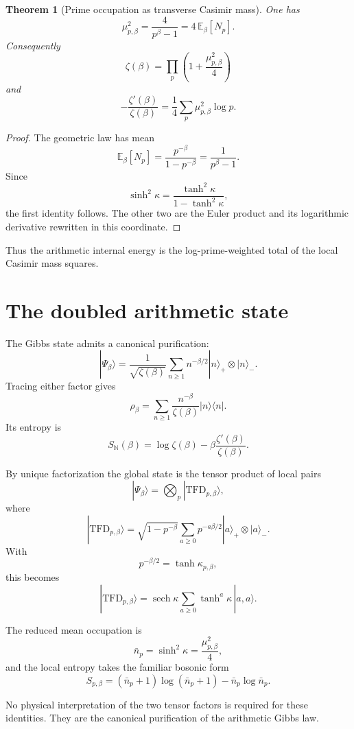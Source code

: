 \documentclass[11pt]{article}
\newtheorem{theorem}{Theorem}[section]
\theoremstyle{definition}
\theoremstyle{remark}
\begin{document}
\begin{theorem}[Prime occupation as transverse Casimir mass]
One has
\[
\boxed{
\mu_{p,\beta}^2
=
\frac{4}{p^\beta-1}
=
4\,\mathbb E_\beta[N_p].
}
\]
Consequently
\[
\boxed{
\zeta(\beta)
=
\prod_p
\left(1+\frac{\mu_{p,\beta}^2}{4}\right)
}
\]
and
\[
\boxed{
-\frac{\zeta'(\beta)}{\zeta(\beta)}
=
\frac14\sum_p
\mu_{p,\beta}^2\log p.
}
\]
\end{theorem}

\begin{proof}
The geometric law has mean
\[
\mathbb E_\beta[N_p]
=
\frac{p^{-\beta}}{1-p^{-\beta}}
=
\frac1{p^\beta-1}.
\]
Since
\[
\sinh^2\kappa
=
\frac{\tanh^2\kappa}{1-\tanh^2\kappa},
\]
the first identity follows.  The other two are the Euler product and its logarithmic derivative rewritten in this coordinate.
\end{proof}

Thus the arithmetic internal energy is the log-prime-weighted total of the local Casimir mass squares.

\section{The doubled arithmetic state}

The Gibbs state admits a canonical purification:
\[
\boxed{
|\Psi_\beta\rangle
=
\frac1{\sqrt{\zeta(\beta)}}
\sum_{n\ge1}
n^{-\beta/2}
|n\rangle_+\otimes|n\rangle_-.
}
\]
Tracing either factor gives
\[
\rho_\beta
=
\sum_{n\ge1}
\frac{n^{-\beta}}{\zeta(\beta)}
|n\rangle\langle n|.
\]
Its entropy is
\[
\boxed{
S_{\mathbb N}(\beta)
=
\log\zeta(\beta)
-\beta\frac{\zeta'(\beta)}{\zeta(\beta)}.
}
\]

By unique factorization the global state is the tensor product of local pairs
\[
|\Psi_\beta\rangle
=
\bigotimes_p
|\mathrm{TFD}_{p,\beta}\rangle,
\]
where
\[
|\mathrm{TFD}_{p,\beta}\rangle
=
\sqrt{1-p^{-\beta}}
\sum_{a\ge0}
p^{-a\beta/2}
|a\rangle_+\otimes|a\rangle_-.
\]
With
\[
p^{-\beta/2}=\tanh\kappa_{p,\beta},
\]
this becomes
\[
|\mathrm{TFD}_{p,\beta}\rangle
=
\operatorname{sech}\kappa
\sum_{a\ge0}
\tanh^a\kappa\,|a,a\rangle.
\]

The reduced mean occupation is
\[
\bar n_p=\sinh^2\kappa
=\frac{\mu_{p,\beta}^2}{4},
\]
and the local entropy takes the familiar bosonic form
\[
S_{p,\beta}
=
(\bar n_p+1)\log(\bar n_p+1)
-
\bar n_p\log\bar n_p.
\]

No physical interpretation of the two tensor factors is required for these identities.  They are the canonical purification of the arithmetic Gibbs law.
\end{document}
